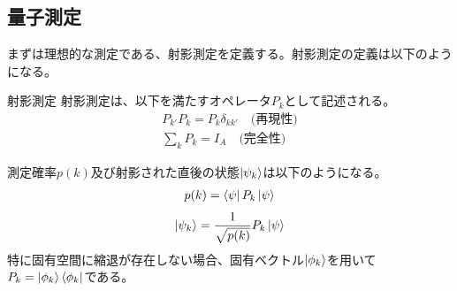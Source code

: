 \documentclass[a4paper,10.5pt]{article}
\numberwithin{equation}{section}
\begin{document}
 \subsection{量子測定}
まずは理想的な測定である、射影測定を定義する。射影測定の定義は以下のようになる。
\begin{defbox}{射影測定}
射影測定は、以下を満たすオペレータ$P_{k}$として記述される。
\begin{equation}\begin{split}
P_{k'}P_{k}=P_{k}\delta_{kk'}\quad \text{(再現性)}\\
\sum_{k}P_{k}=I_{A} \quad \text{(完全性)}
\end{split} \end{equation}
\end{defbox}
測定確率$p(k)$及び射影された直後の状態$\ket{\psi_{k}}$は以下のようになる。
\begin{equation}\begin{split}
    p(k)=\bra{\psi}P_{k}\ket{\psi}
\end{split} \end{equation}
\begin{equation}\begin{split}
    \ket{\psi_{k}}=\frac{1}{\sqrt{p(k)}}P_{k}\ket{\psi}
\end{split} \end{equation}
特に固有空間に縮退が存在しない場合、固有ベクトル$\ket{\phi_{k}}$を用いて$P_{k}=\ket{\phi_{k}}\bra{\phi_{k}}$である。
\end{document}
